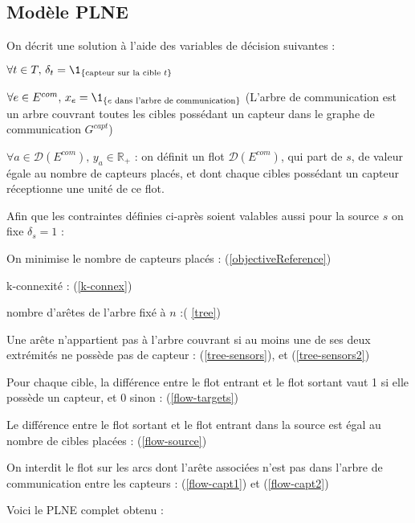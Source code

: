 \documentclass[12pt]{article}
\begin{document}
\subsection{Modèle PLNE}

\noindent On décrit une solution à l'aide des variables de décision suivantes :
\begin{bulletlist}
  \item $\forall t\in T,\, \delta_t = \1_{\{\text{capteur sur la cible } t\}}$
  \item $\forall e\in E^{com},\, x_e = \1_{\{e \text{ dans l'arbre de communication}\}}$ (L'arbre de communication est un arbre couvrant toutes les cibles possédant un capteur dans le graphe de communication $G^{capt}$)
  \item $\forall a\in \mathcal{D}(E^{com}),\, y_a\in \mathbb{R}_+$ : on définit un flot $\mathcal{D}(E^{com})$, qui part de $s$, de valeur égale au nombre de capteurs placés, et dont chaque cibles possédant un capteur réceptionne une unité de ce flot.
\end{bulletlist}

\bigskip

\noindent Afin que les contraintes définies ci-après soient valables aussi pour la source $s$ on fixe $\delta_s = 1$ :

\begin{bulletlist}
  \item On minimise le nombre de capteurs placés : (\ref{objectiveReference})
  \item k-connexité : (\ref{k-connex})
  \item nombre d'arêtes de l'arbre fixé à $n$ :( \ref{tree})
  \item Une arête n'appartient pas à l'arbre couvrant si au moins une de ses deux extrémités ne possède pas de capteur : (\ref{tree-sensors}), et (\ref{tree-sensors2})
  \item Pour chaque cible, la différence entre le flot entrant et le flot sortant vaut 1 si elle possède un capteur, et 0 sinon : (\ref{flow-targets})
  \item Le différence entre le flot sortant et le flot entrant dans la source est égal au nombre de cibles placées : (\ref{flow-source})
  \item On interdit le flot sur les arcs dont l'arête associées n'est pas dans l'arbre de communication entre les capteurs : (\ref{flow-capt1}) et (\ref{flow-capt2})
\end{bulletlist}

\noindent Voici le PLNE complet obtenu :
\end{document}
